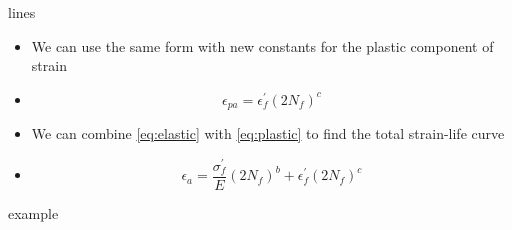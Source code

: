 \documentclass[10pt]{beamer}
\begin{document}
\begin{frame}{lines}
	\begin{itemize}[<+->]
		\item We can use the same form with new constants for the plastic component of strain
		\item[]\begin{equation}
		\label{eq:plastic}
		\epsilon_{pa} = \epsilon_f^\prime (2 N_f)^c
		\end{equation}
		\item We can combine \ref{eq:elastic} with \ref{eq:plastic} to find the total strain-life curve
		\item[] \begin{equation}
		\epsilon_a = \frac{\sigma_f^\prime}{E} (2N_f)^b + \epsilon_f^\prime (2 N_f)^c
		\end{equation}
	\end{itemize}
\end{frame}

\begin{frame}{example}
	
\end{frame}
\end{document}
